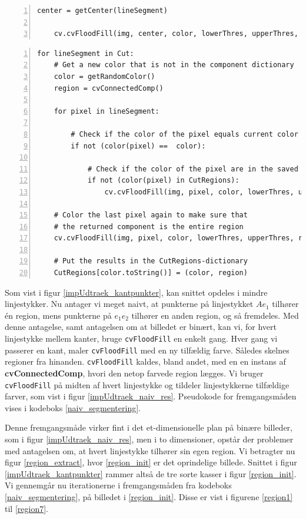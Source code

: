 {\begin{lstlisting}[caption={Naiv pseudokode til segmentering af binære
    billeder.},captionpos=b,label={naiv_segmentering},numbers=left,
    frame=tb, breaklines=false, float=p]
    center = getCenter(lineSegment)

    cv.cvFloodFill(img, center, color, lowerThres, upperThres, region)

\end{lstlisting}

\begin{lstlisting}[caption={Original pseudokode til udtrækning af
    regioner. Denne kan returnere den samme region flere
    gange.},captionpos=b,label={pseudo_udtraek_org},numbers=left,
    frame=tb, breaklines=false, float=h]
for lineSegment in Cut:
    # Get a new color that is not in the component dictionary
    color = getRandomColor()
    region = cvConnectedComp()

    for pixel in lineSegment:

        # Check if the color of the pixel equals current color
        if not (color(pixel) ==  color):

            # Check if the color of the pixel are in the saved regions
            if not (color(pixel) in CutRegions):
                cv.cvFloodFill(img, pixel, color, lowerThres, upperThres, region)

    # Color the last pixel again to make sure that
    # the returned component is the entire region
    cv.cvFloodFill(img, pixel, color, lowerThres, upperThres, region)

    # Put the results in the CutRegions-dictionary
    CutRegions[color.toString()] = (color, region)
\end{lstlisting}

Som vist i figur \ref{impUdtraek_kantpunkter}, kan snittet opdeles i
mindre linjestykker. Nu antager vi meget naivt, at punkterne på
linjestykket $Ae_1$ tilhører én region, mens punkterne på $e_1e_2$
tilhører en anden region, og så fremdeles. Med denne antagelse, samt
antagelsen om at billedet er binært, kan vi, for hvert linjestykke
mellem kanter, bruge \texttt{cvFloodFill} en enkelt gang. Hver gang vi
passerer en kant, maler \texttt{cvFloodFill} med en ny tilfældig farve.
Således skelnes regioner fra hinanden. \texttt{cvFloodFill} kaldes,
bland andet, med en en instans af \textbf{cvConnectedComp}, hvori den
netop farvede region lægges. Vi bruger \texttt{cvFloodFill} på midten af
hvert linjestykke og tildeler linjestykkerne tilfældige farver, som vist
i figur \ref{impUdtraek_naiv_res}. Pseudokode for fremgangsmåden vises i
kodeboks \ref{naiv_segmentering}.

Denne fremgangsmåde virker fint i det et-dimensionelle plan på binære
billeder, som i figur \ref{impUdtraek_naiv_res}, men i to dimensioner,
opstår der problemer med antagelsen om, at hvert linjestykke tilhører
sin egen region. Vi betragter nu figur \ref{region_extract}, hvor
\ref{region_init} er det oprindelige billede.  Snittet i figur
\ref{impUdtraek_kantpunkter} rammer altså de tre sorte kasser i figur
\ref{region_init}. Vi gennemgår nu iterationerne i fremgangsmåden fra
kodeboks \ref{naiv_segmentering}, på billedet i \ref{region_init}.
Disse er vist i figurene \ref{region1} til \ref{region7}.

}
